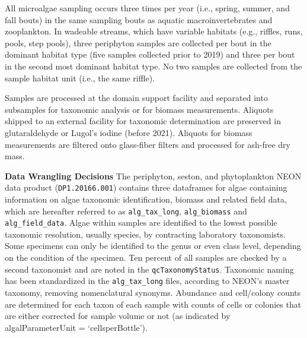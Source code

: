 \documentclass[
  12pt,
]{article}
\begin{document}
All microalgae sampling occurs three times per year (i.e., spring, summer, and fall bouts) in the same sampling bouts as aquatic macroinvertebrates and zooplankton. In wadeable streams, which have variable habitats (e.g., riffles, runs, pools, step pools), three periphyton samples are collected per bout in the dominant habitat type (five samples collected prior to 2019) and three per bout in the second most dominant habitat type. No two samples are collected from the sample habitat unit (i.e., the same riffle).

Samples are processed at the domain support facility and separated into subsamples for taxonomic analysis or for biomass measurements. Aliquots shipped to an external facility for taxonomic determination are preserved in glutaraldehyde or Lugol's iodine (before 2021). Aliquots for biomass measurements are filtered onto glass-fiber filters and processed for ash-free dry mass.

\textbf{Data Wrangling Decisions} The periphyton, seston, and phytoplankton NEON data product (\texttt{DP1.20166.001}) contains three dataframes for algae containing information on algae taxonomic identification, biomass and related field data, which are hereafter referred to as \texttt{alg\_tax\_long}, \texttt{alg\_biomass} and \texttt{alg\_field\_data}. Algae within samples are identified to the lowest possible taxonomic resolution, usually species, by contracting laboratory taxonomists. Some specimens can only be identified to the genus or even class level, depending on the condition of the specimen. Ten percent of all samples are checked by a second taxonomist and are noted in the \texttt{qcTaxonomyStatus}. Taxonomic naming has been standardized in the \texttt{alg\_tax\_long} files, according to NEON's master taxonomy, removing nomenclatural synonyms. Abundance and cell/colony counts are determined for each taxon of each sample with counts of cells or colonies that are either corrected for sample volume or not (as indicated by algalParameterUnit = `cellsperBottle').
\end{document}
